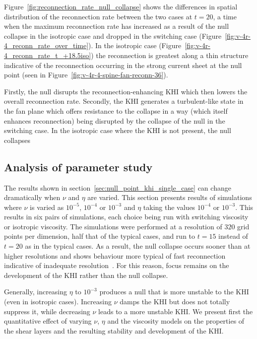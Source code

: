 Figure~\ref{fig:reconnection_rate_null_collapse} shows the differences in spatial distribution of the reconnection rate between the two cases at $t=20$, a time when the maximum reconnection rate has increased as a result of the null collapse in the isotropic case and dropped in the switching case (Figure~\ref{fig:v-4r-4_reconn_rate_over_time}). In the isotropic case (Figure~\ref{fig:v-4r-4_reconn_rate_t_+18.5iso}) the reconnection is greatest along a thin structure indicative of the reconnection occurring in the strong current sheet at the null point (seen in Figure~\ref{fig:v-4r-4-spine-fan-reconn-36}).

Firstly, the null disrupts the reconnection-enhancing KHI which then lowers the overall reconnection rate. Secondly, the KHI generates a turbulent-like state in the fan plane which offers resistance to the collapse in a way  (which itself enhances reconnection) being disrupted by the collapse of the null in the switching case. In the isotropic case where the KHI is not present, the null collapses 

\subsection{Analysis of parameter study}

The results shown in section~\ref{sec:null_point_khi_single_case} can change dramatically when $\nu$ and $\eta$ are varied. This section presents results of simulations where $\nu$ is varied as $10^{-5}$, $10^{-4}$ or $10^{-3}$ and $\eta$ taking the values $10^{-4}$ or $10^{-3}$. This results in six pairs of simulations, each choice being run with switching viscosity or isotropic viscosity. The simulations were performed at a resolution of $320$ grid points per dimension, half that of the typical cases, and run to $t=15$ instead of $t=20$ as in the typical cases. As a result, the null collapse occurs sooner than at higher resolutions and shows behaviour more typical of fast reconnection indicative of inadequate resolution~\cite{miyamaNumericalAstrophysicsProceedings2012}. For this reason, focus remains on the development of the KHI rather than the null collapse.

Generally, increasing $\eta$ to $10^{-3}$ produces a null that is more unstable to the KHI (even in isotropic cases). Increasing $\nu$ damps the KHI but does not totally suppress it, while decreasing $\nu$ leads to a more unstable KHI. We present first the quantitative effect of varying $\nu$, $\eta$ and the viscosity models on the properties of the shear layers and the resulting stability and development of the KHI.

